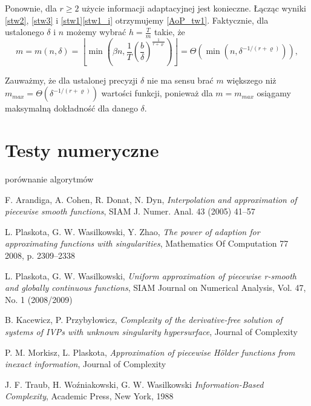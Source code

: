 \documentclass[oik, pdftex, robocza, man]{mgrwms}
\begin{document}
    Ponownie, dla $r \geq 2$ użycie informacji adaptacyjnej jest konieczne. Łącząc wyniki \ref{stw2}, \ref{stw3} i \ref{stw1}\ref{stw1_i} otrzymujemy \ref{AoP_tw1}.
    Faktycznie, dla ustalonego $\delta$ i $n$ możemy wybrać $h = \frac{T}{m}$ takie, że
    \begin{equation}
        m = m(n, \delta)=\left\lfloor\min \left(\beta n, \frac{1}{T}\left(\frac{b}{\delta}\right)^{\frac{1}{r+\varrho}}\right)\right\rfloor=\varTheta\left(\min \left(n, \delta^{-1 /(r+\varrho)}\right)\right),
    \end{equation}

    \begin{uw}
        Zauważmy, że dla ustalonej precyzji $\delta$ nie ma sensu brać $m$ większego niż $m_{max} = \varTheta(\delta^{-1 / (r+\varrho)})$ wartości funkcji, ponieważ dla $m = m_{max}$ osiągamy maksymalną dokładność dla danego $\delta$.
    \end{uw}

\mgrclosechapter


\chapter{Testy numeryczne}

porównanie algorytmów

\mgrclosechapter



%  
\begin{thebibliography}{88}

    F. Arandiga, A. Cohen, R. Donat, N. Dyn,
    \emph{Interpolation and approximation of piecewise smooth functions}, SIAM J. Numer. Anal. 43 (2005) 41–57

    L. Plaskota, G. W. Wasilkowski, Y. Zhao, 
    \emph{The power of adaption for approximating functions with singularities}, Mathematics Of Computation 77
    2008, p. 2309–2338

    L. Plaskota, G. W. Wasilkowski, 
    \emph{Uniform approximation of piecewise r-smooth and globally continuous functions}, SIAM Journal on Numerical
    Analysis, Vol. 47, No. 1 (2008/2009)

    B. Kacewicz, P. Przybyłowicz, 
    \emph{Complexity of the derivative-free solution of
    systems of IVPs with unknown singularity hypersurface}, Journal of Complexity
    
    P. M. Morkisz, L. Plaskota, 
    \emph{Approximation of piecewise Hölder functions from inexact information}, Journal of Complexity

    J. F. Traub, H. Woźniakowski, G. W. Wasilkowski
    \emph{Information-Based Complexity}, Academic Press, New York, 1988

\end{thebibliography}
\end{document}
